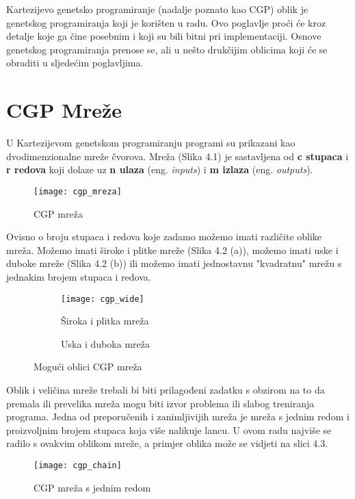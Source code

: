 \quad Kartezijevo genetsko programiranje (nadalje poznato kao CGP) oblik je genetskog programiranja koji je korišten u radu. Ovo poglavlje proći će kroz detalje koje ga čine posebnim i koji su bili bitni pri implementaciji. Osnove genetskog programiranja prenose se, ali u nešto drukčijim oblicima koji će se obraditi u sljedećim poglavljima.\par 
\section{CGP Mreže} 
\quad U Kartezijevom genetskom programiranju programi su prikazani kao dvodimenzionalne mreže čvorova. Mreža (Slika 4.1) je sastavljena od \textbf{c stupaca} i \textbf{r redova} koji dolaze uz \textbf{n ulaza} (eng. \textit{inputs}) i \textbf{m izlaza} (eng. \textit{outputs}).\newline
\begin{figure}[h]
	\centering
	\texttt{[image: cgp\_mreza]}
	\caption{CGP mreža \cite{CGPpresentation}}
\end{figure}  
\par 
Ovisno o broju stupaca i redova koje zadamo možemo imati različite oblike mreža. Možemo imati široke i plitke mreže (Slika 4.2 (a)), možemo imati uske i duboke mreže (Slika 4.2 (b)) ili možemo imati jednostavnu "kvadratnu" mrežu s jednakim brojem stupaca i redova.
\begin{figure}[h]
	\begin{subfigure}{0.5\textwidth}
		\texttt{[image: cgp\_wide]} 
		\caption{Široka i plitka mreža \cite{CGPpresentation}}
	\end{subfigure}
	\begin{subfigure}[b]{0.5\textwidth}
		\caption{Uska i duboka mreža \cite{CGPpresentation}}
	\end{subfigure}
	
	\caption{Mogući oblici CGP mreža}
\end{figure}
\newpage
\par Oblik i veličina mreže trebali bi biti prilagođeni zadatku s obzirom na to da premala ili prevelika mreža mogu biti izvor problema ili slabog treniranja programa. Jedna od preporučenih i zanimljivijih mreža je mreža s jednim redom i proizvoljnim brojem stupaca koja više nalikuje lancu. U ovom radu najviše se radilo s ovakvim oblikom mreže, a primjer oblika može se vidjeti na slici 4.3.

\begin{figure}[h]
	\centering
	\texttt{[image: cgp\_chain]}
	\caption{CGP mreža s jednim redom \cite{CGPpresentation}}
\end{figure}
